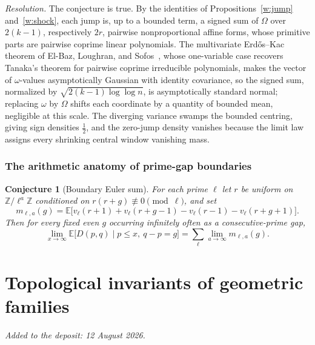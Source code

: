 \documentclass[11pt]{article}
\newtheorem{conjecture}{Conjecture}
\theoremstyle{definition}
\newcommand{\Z}{\mathbb Z}
\providecommand{\Z}{\mathbb Z}
\begin{document}
\emph{Resolution.} The conjecture is true.  By the identities of Propositions~\ref{w:jump} and~\ref{w:shock}, each jump is, up to a bounded term, a signed sum of $\Omega$ over $2(k-1)$, respectively $2r$, pairwise nonproportional affine forms, whose primitive parts are pairwise coprime linear polynomials.  The multivariate Erd\H{o}s--Kac theorem of El-Baz, Loughran, and Sofos~\cite{ELS22}, whose one-variable case recovers Tanaka's theorem for pairwise coprime irreducible polynomials, makes the vector of $\omega$-values asymptotically Gaussian with identity covariance, so the signed sum, normalized by $\sqrt{2(k-1)\log\log n}$, is asymptotically standard normal; replacing $\omega$ by $\Omega$ shifts each coordinate by a quantity of bounded mean, negligible at this scale.  The diverging variance swamps the bounded centring, giving sign densities $\tfrac12$, and the zero-jump density vanishes because the limit law assigns every shrinking central window vanishing mass.

\section{The arithmetic anatomy of prime-gap boundaries}

\begin{conjecture}[Boundary Euler sum]\label{w20}
For each prime $\ell$ let $r$ be uniform on $\Z/\ell^a\Z$ conditioned on $r(r+g)\not\equiv0\pmod\ell$, and set
\[
m_{\ell,a}(g)=\mathbb E\bigl[v_\ell(r+1)+v_\ell(r+g-1)-v_\ell(r-1)-v_\ell(r+g+1)\bigr].
\]
Then for every fixed even $g$ occurring infinitely often as a consecutive-prime gap,
\[
\lim_{x\to\infty}\mathbb E\bigl[D(p,q)\mid p\le x,\ q-p=g\bigr]=\sum_\ell\lim_{a\to\infty}m_{\ell,a}(g).
\]
\end{conjecture}

\part{Topological invariants of geometric families}

\medskip\noindent\emph{Added to the deposit: 12 August 2026.}\par\medskip
\end{document}
